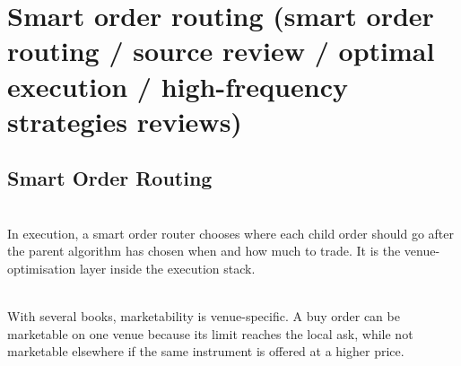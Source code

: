 \documentclass[a4paper,oneside,openany]{book}
\begin{document}
\section*{Smart order routing (smart order routing / source review / optimal execution / high-frequency strategies reviews)}

\subsection*{Smart Order Routing}

\begin{definition} \\
In execution, a smart order router chooses where each child order should go after the parent algorithm has chosen when and how much to trade. It is the venue-optimisation layer inside the execution stack.
\end{definition}

\begin{definition} \\
With several books, marketability is venue-specific. A buy order can be marketable on one venue because its limit reaches the local ask, while not marketable elsewhere if the same instrument is offered at a higher price.
\end{definition}
\end{document}
